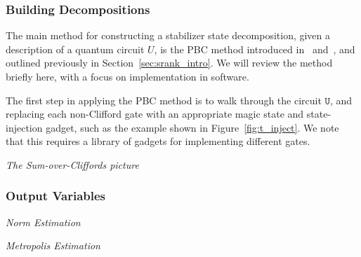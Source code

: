 \subsubsection*{Building Decompositions}
The main method for constructing a stabilizer state decomposition, given a description of a quantum circuit $U$, is the PBC method introduced in~\cite{Bravyi2015} and~\cite{Bravyi2016}, and outlined previously in Section~\ref{sec:srank_intro}. We will review the method briefly here, with a focus on implementation in software. \par
The first step in applying the PBC method is to walk through the circuit $\texttt{U}$, and replacing each non-Clifford gate with an appropriate magic state and state-injection gadget, such as the example shown in Figure~\ref{fig:t_inject}. We note that this requires a library of gadgets for implementing different gates.\par
\large{\itshape{The Sum-over-Cliffords picture}}\par
\subsubsection*{Output Variables}
\large{\itshape{Norm Estimation}}\par
\large{\itshape{Metropolis Estimation}}\par

